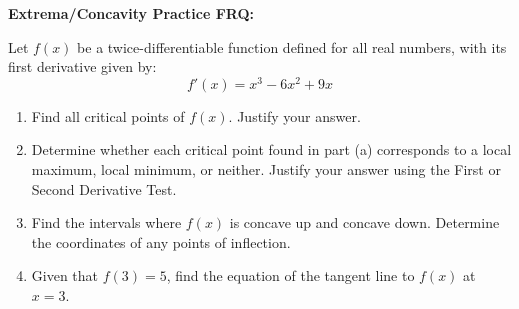 \documentclass{article}
\begin{document}
\begin{center}
    {\fontsize{25}{80}\selectfont \textbf{Extrema/Concavity Practice FRQ:}} %
\end{center}

\vspace{10pt}

\noindent Let \( f(x) \) be a twice-differentiable function defined for all real numbers, with its first derivative given by:
\[
f'(x) = x^3 - 6x^2 + 9x
\]

\vspace{60pt} %

\begin{enumerate}
    \item Find all critical points of \( f(x) \). Justify your answer.

    \vspace{65pt} %

    \item Determine whether each critical point found in part (a) corresponds to a local maximum, local minimum, or neither. Justify your answer using the First or Second Derivative Test.

    \vspace{65pt} %

    \item Find the intervals where \( f(x) \) is concave up and concave down. Determine the coordinates of any points of inflection.

    \vspace{65pt} %

    \item Given that \( f(3) = 5 \), find the equation of the tangent line to \( f(x) \) at \( x = 3 \).
\end{enumerate}
\end{document}
